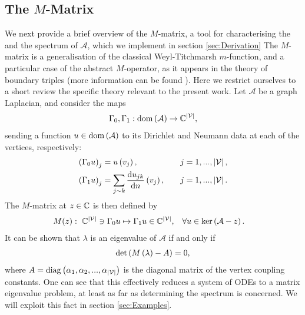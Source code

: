 \subsection{The $M$-Matrix} \label{ssec:MMatrix}
We next provide a brief overview of the $M$-matrix, a tool for characterising the  and the spectrum of $\mathcal{A}$, which we implement in section \ref{sec:Derivation}
The $M$-matrix is a generalisation of the classical Weyl-Titchmarsh $m$-function, and a particular case of the abstract $M$-operator, as it appears in the theory of boundary triples (more information can be found ).
Here we restrict ourselves to a short review the specific theory relevant to the present work.
Let $\mathcal{A}$ be a graph Laplacian, and consider the maps
\begin{align*}
	\Gamma_0, \Gamma_1: \mathrm{dom}\left( \mathcal{A} \right) \rightarrow \mathbb{C}^{\left\lvert \mathcal{V} \right\rvert},
\end{align*}
sending a function $u\in\mathrm{dom}\left( \mathcal{A} \right)$ to its Dirichlet and Neumann data at each of the vertices, respectively:
\begin{align*}
	\left( \Gamma_0 u \right)_j &= u\left( v_j \right), \quad &j=1,...,\left\lvert \mathcal{V} \right\rvert, \\
	\left( \Gamma_1 u \right)_j &= \sum_{j\sim k}\dfrac{\mathrm{d}u_{jk}}{\mathrm{d}n}\left( v_j \right), \quad &j=1,...,\left\lvert \mathcal{V} \right\rvert. 
\end{align*}
The $M$-matrix at $z\in\mathbb{C}$ is then defined by
\begin{align*}
	M(z): \ \mathbb{C}^{\left\lvert \mathcal{V} \right\rvert} \ni \Gamma_0 u \mapsto \Gamma_1 u \in \mathbb{C}^{\left\lvert \mathcal{V} \right\rvert},
	 &\quad \forall u\in\mathrm{ker}\left( \mathcal{A}-z \right).
\end{align*}
It can be shown that $\lambda$ is an eigenvalue of $\mathcal{A}$ if and only if
\begin{align*}
	\mathrm{det}\left( M\left( \lambda \right) - A \right)= 0,
\end{align*}
where $A = \mathrm{diag}\left( \alpha_1, \alpha_2, ... , \alpha_{\left\lvert \mathcal{V} \right\rvert} \right)$ is the diagonal matrix of the vertex coupling constants.
One can see that this effectively reduces a system of ODEs to a matrix eigenvalue problem, at least as far as determining the spectrum is concerned.
We will exploit this fact in section \ref{sec:Examples}.

